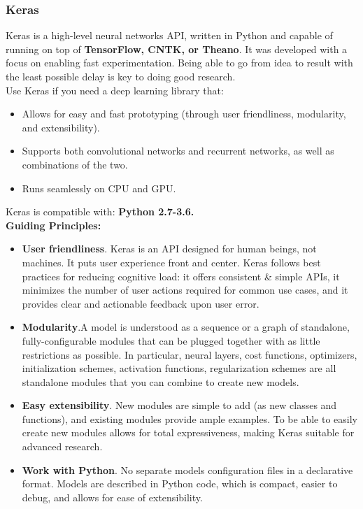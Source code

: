 \subsubsection{Keras}
Keras\cite{keras} is a high-level neural networks API, written in Python and capable of running on top of \textbf{TensorFlow, CNTK, or Theano}. It was developed with a focus on enabling fast experimentation. Being able to go from idea to result with the least possible delay is key to doing good research.
\\
Use Keras if you need a deep learning library that:
\begin{itemize}
	\item Allows for easy and fast prototyping (through user friendliness, modularity, and extensibility).
	\item Supports both convolutional networks and recurrent networks, as well as combinations of the two.
	\item Runs seamlessly on CPU and GPU.
\end{itemize}
Keras is compatible with: \textbf{Python 2.7-3.6.}
\\
\textbf{Guiding Principles:}
\begin{itemize}
	\item \textbf{User friendliness}. Keras\cite{keras} is an API designed for human beings, not machines. It puts user experience front and center. Keras follows best practices for reducing cognitive load: it offers consistent \& simple APIs, it minimizes the number of user actions required for common use cases, and it provides clear and actionable feedback upon user error.
	\item \textbf{Modularity}.A model is understood as a sequence or a graph of standalone, fully-configurable modules that can be plugged together with as little restrictions as possible. In particular, neural layers, cost functions, optimizers, initialization schemes, activation functions, regularization schemes are all standalone modules that you can combine to create new models.
	\item \textbf{Easy extensibility}. New modules are simple to add (as new classes and functions), and existing modules provide ample examples. To be able to easily create new modules allows for total expressiveness, making Keras suitable for advanced research.
	\item \textbf{Work with Python}. No separate models configuration files in a declarative format. Models are described in Python code, which is compact, easier to debug, and allows for ease of extensibility.
\end{itemize}
